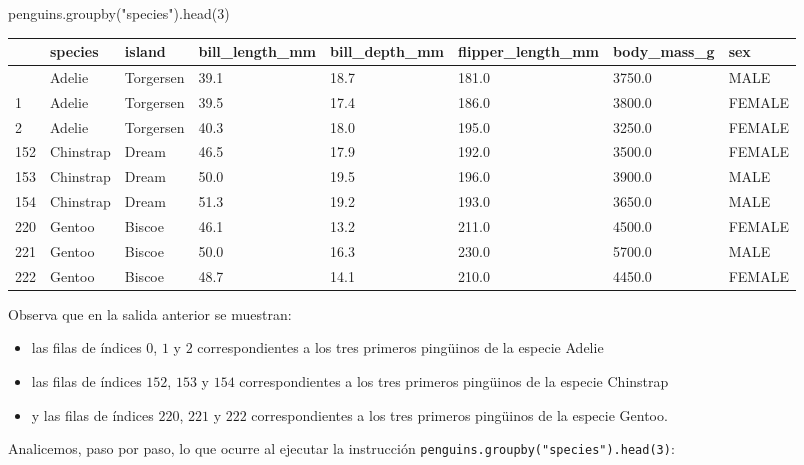 \documentclass[
  a4paper,
  noprof,
  12pt,
  notoc,
  nosols,
  nobib]{mnye}
\newenvironment{Shaded}{\begin{snugshade}}{\end{snugshade}}
\newcommand{\DecValTok}[1]{\textcolor[rgb]{0.68,0.00,0.00}{#1}}
\newcommand{\NormalTok}[1]{\textcolor[rgb]{0.00,0.23,0.31}{#1}}
\newcommand{\StringTok}[1]{\textcolor[rgb]{0.13,0.47,0.30}{#1}}
\providecommand{\tightlist}{%
  \setlength{\itemsep}{0pt}\setlength{\parskip}{0pt}}\usepackage{longtable,booktabs,array}
\theoremstyle{definition}
\theoremstyle{remark}
\begin{document}
\begin{Shaded}
\begin{Highlighting}[]
\NormalTok{penguins.groupby(}\StringTok{"species"}\NormalTok{).head(}\DecValTok{3}\NormalTok{)}
\end{Highlighting}
\end{Shaded}

\begin{longtable}[]{@{}llllllll@{}}
\toprule\noalign{}
& species & island & bill\_length\_mm & bill\_depth\_mm &
flipper\_length\_mm & body\_mass\_g & sex \\
\midrule\noalign{}
\endhead
\bottomrule\noalign{}
\endlastfoot
0 & Adelie & Torgersen & 39.1 & 18.7 & 181.0 & 3750.0 & MALE \\
1 & Adelie & Torgersen & 39.5 & 17.4 & 186.0 & 3800.0 & FEMALE \\
2 & Adelie & Torgersen & 40.3 & 18.0 & 195.0 & 3250.0 & FEMALE \\
152 & Chinstrap & Dream & 46.5 & 17.9 & 192.0 & 3500.0 & FEMALE \\
153 & Chinstrap & Dream & 50.0 & 19.5 & 196.0 & 3900.0 & MALE \\
154 & Chinstrap & Dream & 51.3 & 19.2 & 193.0 & 3650.0 & MALE \\
220 & Gentoo & Biscoe & 46.1 & 13.2 & 211.0 & 4500.0 & FEMALE \\
221 & Gentoo & Biscoe & 50.0 & 16.3 & 230.0 & 5700.0 & MALE \\
222 & Gentoo & Biscoe & 48.7 & 14.1 & 210.0 & 4450.0 & FEMALE \\
\end{longtable}

Observa que en la salida anterior se muestran:

\begin{itemize}
\tightlist
\item
  las filas de índices \(0\), \(1\) y \(2\) correspondientes a los tres
  primeros pingüinos de la especie Adelie
\item
  las filas de índices \(152\), \(153\) y \(154\) correspondientes a los
  tres primeros pingüinos de la especie Chinstrap
\item
  y las filas de índices \(220\), \(221\) y \(222\) correspondientes a
  los tres primeros pingüinos de la especie Gentoo.
\end{itemize}

Analicemos, paso por paso, lo que ocurre al ejecutar la instrucción
\texttt{penguins.groupby("species").head(3)}:
\end{document}
